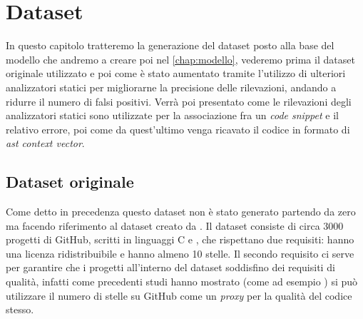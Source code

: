 \chapter{Dataset}\label{chap:dataset}
In questo capitolo tratteremo la generazione del dataset posto alla base del modello che andremo a creare poi nel \autoref{chap:modello}, vederemo prima il dataset originale utilizzato e poi 
come è stato aumentato tramite l'utilizzo di ulteriori analizzatori statici per migliorarne la precisione delle rilevazioni, andando a ridurre il numero di falsi positivi.
Verrà poi presentato come le rilevazioni degli analizzatori statici sono utilizzate per la associazione fra un \textit{code snippet} e il relativo errore, poi come da quest'ultimo venga ricavato il codice in formato di \textit{ast context vector}.

\section{Dataset originale}
Come detto in precedenza questo dataset non è stato generato partendo da zero ma facendo riferimento al dataset creato da \cite{gelman2019source}. Il dataset consiste di circa 3000 progetti di GitHub, scritti in linguaggi C e \CPP,
 che rispettano due requisiti: hanno una licenza ridistribuibile e hanno almeno 10 stelle.
 Il secondo requisito ci serve per garantire che i progetti all'interno del dataset soddisfino dei requisiti di qualità, infatti come precedenti studi hanno mostrato (come ad esempio \cite{papamichail2016user}) si può utilizzare il numero
 di stelle su GitHub come un \textit{proxy} per la qualità del codice stesso.

